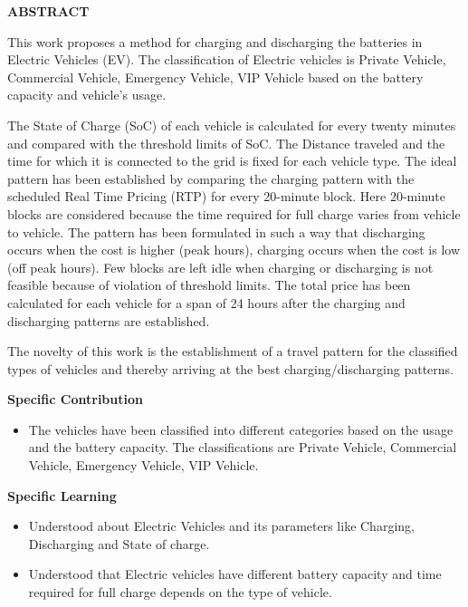 \documentclass[a4paper, 12pt, oneside]{sastra}
\begin{document}
	\begin{center}
		\Large{{\textbf{ABSTRACT}}}
	\end{center}
	
	
	\vspace*{24pt}
	
	\noindent This work proposes a method for charging and discharging the batteries in Electric Vehicles (EV). The classification of Electric vehicles is Private Vehicle, Commercial Vehicle, Emergency Vehicle, VIP Vehicle based on the battery capacity and vehicle's usage.
	
	\noindent The State of Charge (SoC) of each vehicle is calculated for every twenty minutes and compared with the threshold limits of SoC. The Distance traveled and the time for which it is connected to the grid is fixed for each vehicle type. The ideal pattern has been established by comparing the charging pattern with the scheduled Real Time Pricing (RTP) for every 20-minute block. Here 20-minute blocks are considered because the time required for full charge varies from vehicle to vehicle. The pattern has been formulated in such a way that discharging occurs when the cost is higher (peak hours), charging occurs when the cost is low (off peak hours). Few blocks are left idle when charging or discharging is not feasible because of violation of threshold limits. The total price has been calculated for each vehicle for a span of 24 hours after the charging and discharging patterns are established.
	
	\noindent The novelty of this work is the establishment of a travel pattern for the classified types of vehicles and thereby arriving at the best charging/discharging patterns.
	
	\noindent \textbf{Specific Contribution}
	\begin{itemize}
		\item The vehicles have been classified into different categories based on the usage and the battery capacity. The classifications are Private Vehicle, Commercial Vehicle, Emergency Vehicle, VIP Vehicle.

	\end{itemize}
	\noindent \textbf{Specific Learning}
	\begin{itemize}
		\item Understood about Electric Vehicles and its parameters like Charging, Discharging and State of charge.
		\item Understood that Electric vehicles have different battery capacity and time required for full charge depends on the type of vehicle.
	\end{itemize}
	
\end{document}
